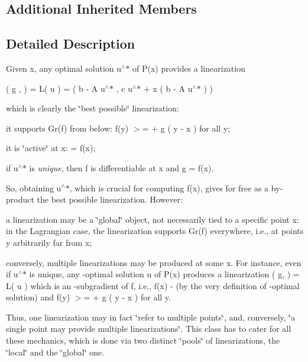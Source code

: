 \subsection*{Additional Inherited Members}


\subsection{Detailed Description}
Given x, any optimal solution u$^\wedge$$\ast$ of P(x) provides a linearization

( g ,  ) = L( u ) = ( b -\/ A u$^\wedge$$\ast$ , c u$^\wedge$$\ast$ + x ( b -\/ A u$^\wedge$$\ast$ ) )

which is clearly the \char`\"{}best possible\char`\"{} linearization\+:


\begin{DoxyItemize}
\item it supports Gr(f) from below\+: f(y) $>$=  + g ( y -\/ x ) for all y;
\item it is \char`\"{}active\char`\"{} at x\+:  = f(x);
\item if u$^\wedge$$\ast$ is {\itshape unique}, then f is differentiable at x and g =  f(x).
\end{DoxyItemize}

So, obtaining u$^\wedge$$\ast$, which is crucial for computing f(x), gives for free as a by-\/product the best possible linearization. However\+:


\begin{DoxyItemize}
\item a linearization may be a \char`\"{}global\char`\"{} object, not necessarily tied to a specific point x\+: in the Lagrangian case, the linearization supports Gr(f) everywhere, i.\+e., at points y arbitrarily far from x;
\item conversely, multiple linearizations may be produced at some x. For instance, even if u$^\wedge$$\ast$ is unique, any -\/optimal solution u\textquotesingle{} of P(x) produces a linearization ( g\textquotesingle{}, \textquotesingle{} ) = L( u\textquotesingle{} ) which is an -\/subgradient of f, i.\+e., \textquotesingle{}  f(x) -\/  (by the very definition of -\/optimal solution) and f(y) $>$= \textquotesingle{} + g\textquotesingle{} ( y -\/ x ) for all y.
\end{DoxyItemize}

Thus, one linearization may in fact \char`\"{}refer to multiple points\char`\"{}, and, conversely, \char`\"{}a single point may provide multiple linearizations\char`\"{}. This class has to cater for all these mechanics, which is done via two distinct \char`\"{}pools\char`\"{} of linearizations, the \char`\"{}local\char`\"{} and the \char`\"{}global\char`\"{} one.

